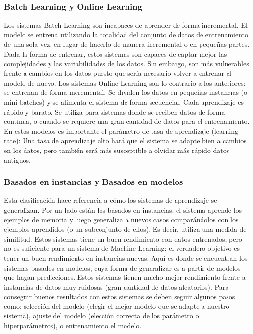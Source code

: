 \documentclass[12pt,a4paper,Spanish]{article}
\begin{document}
\subsubsection{Batch Learning y Online Learning}
Los sistemas Batch Learning son incapaces de aprender de forma incremental. El modelo se entrena utilizando la totalidad del conjunto de datos de entrenamiento de una sola vez, en lugar de hacerlo de manera incremental o en pequeñas partes. Dada la forma de entrenar, estos sistemas son capaces de captar mejor las complejidades y las variabilidades de los datos. Sin embargo, son más vulnerables frente a cambios en los datos puesto que sería necesario volver a entrenar el modelo de nuevo.
\newline
Los sistemas Online Learning son lo contrario a los anteriores: se entrenan de forma incremental. Se dividen los datos en pequeñas instancias (o mini-batches) y se alimenta el sistema de forma secuencial. Cada aprendizaje es rápido y barato. Se utiliza para sistemas donde se reciben datos de forma continua, o cuando se requiere una gran cantidad de datos para el entrenamiento. En estos modelos es importante el parámetro de tasa de aprendizaje (learning rate): Una tasa de aprendizaje alto hará que el sistema se adapte bien a cambios en los datos, pero también será más susceptible a olvidar más rápido datos antiguos.


\subsubsection{Basados en instancias y Basados en modelos}
Esta clasificación hace referencia a cómo los sistemas de aprendizaje se generalizan. Por un lado están los basados en instancias: el sistema aprende los ejemplos de memoria y luego generaliza a nuevos casos comparándolos con los ejemplos aprendidos (o un subconjunto de
ellos). Es decir, utiliza una medida de similitud. Estos sistemas tiene un buen rendimiento con datos entrenados, pero no es suficiente para un sistema de Machine Learning: el verdadero objetivo es tener un buen rendimiento en instancias nuevas.
\newline
Aquí es donde se encuentran los sistemas basados en modelos, cuya forma de generalizar es a partir de modelos que hagan predicciones. Estos sistemas tienen mucho mejor rendimiento frente a instancias de datos muy ruidosas (gran cantidad de datos aleatorios). Para conseguir buenos resultados con estos sistemas se deben seguir algunos pasos como: selección del modelo (elegir el mejor modelo que se adapte a nuestro sistema), ajuste del modelo (elección correcta de los parámetro o hiperparámetros),  o entrenamiento el modelo.
\end{document}
